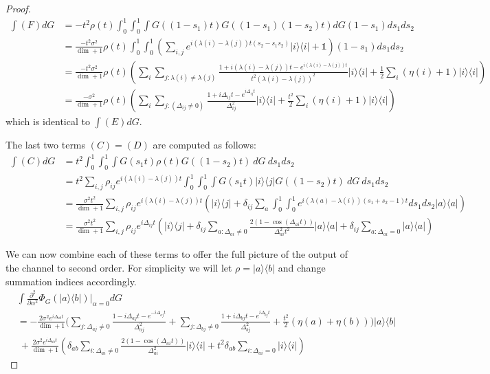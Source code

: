 \documentclass{article}
\newcommand{\ketbra}[2]{| #1\rangle\! \langle #2|}
\newcommand{\parens}[1]{\left( #1 \right)}
\newcommand{\identity}{\mathds{1}}
\begin{document}
\begin{proof}
\begin{align}
    \int (F) dG &= -t^2 \rho(t) \int_0^1 \int_0^1 \int G((1-s_1)t) G((1-s_1)(1 - s_2) t) dG (1-s_1)ds_1 ds_2 \\
    &= \frac{- t^2 \sigma ^2}{\dim + 1} \rho(t) \int_0^1 \int_0^1 \parens{\sum_{i,j} e^{i(\lambda(i) - \lambda(j))t (s_2 - s_1 s_2)}\ketbra{i}{i} + \identity} (1-s_1) ds_1 ds_2 \\
    &= \frac{- t^2 \sigma^2}{\dim + 1} \rho(t) \parens{\sum_{i} \sum_{j : \lambda(i) \neq \lambda(j)} \frac{1 + i (\lambda(i) - \lambda(j))t - e^{i (\lambda(i) - \lambda(j))t}}{t^2 (\lambda(i) - \lambda(j))^2} \ketbra{i}{i} +\frac{1}{2} \sum_{i} (\eta(i) + 1) \ketbra{i}{i}} \\
    &= \frac{- \sigma^2}{\dim + 1} \rho(t) \parens{\sum_i \sum_{j: (\Delta_{ij} \neq 0)} \frac{1 + i \Delta_{ij}t - e^{i\Delta_{ij}t}}{\Delta_{ij}^2} \ketbra{i}{i} + \frac{t^2}{2}\sum_i (\eta(i) + 1) \ketbra{i}{i}}
\end{align}
 which is identical to $\int (E) dG$.

 The last two terms $(C) = (D)$ are computed as follows:
 \begin{align}
     \int (C) dG &= t^2 \int_0^1 \int_0^1 \int G(s_1 t) \rho(t) G((1-s_2)t) ~dG ~ ds_1 ds_2 \\
     &= t^2 \sum_{i,j} \rho_{ij} e^{i(\lambda(i) - \lambda(j))t} \int_0^1 \int_0^1 \int G(s_1 t) \ketbra{i}{j} G((1-s_2)t) ~ dG ~ ds_1 ds_2 \\
     &= \frac{\sigma^2 t^2}{\dim + 1} \sum_{i,j} \rho_{ij} e^{i(\lambda(i) - \lambda(j))t} \parens{ \ketbra{i}{j} + \delta_{ij} \sum_{a} \int_0^1 \int_0^1 e^{i(\lambda(a) - \lambda(i))(s_1 + s_2 - 1)t} ds_1 ds_2 \ketbra{a}{a}} \\
     &= \frac{\sigma^2 t^2}{\dim + 1} \sum_{i,j} \rho_{ij} e^{i \Delta_{ij} t} \parens{\ketbra{i}{j} + \delta_{ij} \sum_{a : \Delta_{ai} \neq 0} \frac{2( 1- \cos (\Delta_{ai} t))}{\Delta_{ai}^2 t^2} \ketbra{a}{a} + \delta_{ij} \sum_{a : \Delta_{ai} = 0} \ketbra{a}{a}}
 \end{align}

 We can now combine each of these terms to offer the full picture of the output of the channel to second order. For simplicity we will let $\rho = \ketbra{a}{b}$ and change summation indices accordingly. 
 \begin{align}
     &\int \frac{\partial^2}{\partial \alpha^2} \Phi_G(\ketbra{a}{b})\bigg|_{\alpha = 0} dG \\
     &= -\frac{2 \sigma^2 e^{i \Delta_{ab} t}}{\dim + 1} \bigg(\sum_{j: \Delta_{aj} \neq 0} \frac{1 - i \Delta_{aj}t - e^{-i \Delta_{aj} t}}{\Delta_{aj}^2} + \sum_{j: \Delta_{bj} \neq 0} \frac{1 + i \Delta_{bj} t - e^{i \Delta_{bj} t}}{\Delta_{bj}^2} + \frac{t^2}{2}(\eta(a) + \eta(b)) \bigg) \ketbra{a}{b} \nonumber \\
    &~ +\frac{2\sigma^2 e^{i \Delta_{ab}t}}{\dim+1} \parens{\delta_{ab} \sum_{i: \Delta_{ai} \neq 0 } \frac{2(1- \cos (\Delta_{ai}t))}{\Delta_{ai}^2} \ketbra{i}{i} + t^2 \delta_{ab} \sum_{i : \Delta_{ai} = 0} \ketbra{i}{i}} \label{eq:second_order_output}
 \end{align}

\end{proof}
\end{document}
